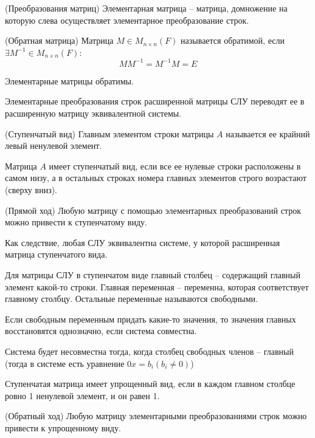 \begin{multicols}{2}
\begin{definition}{(Преобразования матриц)}{}
      Элементарная матрица -- матрица, домножение на которую слева осуществляет элементарное преобразование строк.
\end{definition}
\begin{definition}{(Обратная матрица)}{}
    Матрица $M \in M_{n\times n}(F)$ называется обратимой, если $\exists M^{-1} \in M_{n\times n}(F)$:
    \[
        MM^{-1} = M^{-1}M = E
        \]
\end{definition}
Элементарные матрицы обратимы.
\vspace*{0.3cm}
\begin{note}{}{}
    Элементарные преобразования строк расширенной матрицы СЛУ переводят ее в расширенную матрицу эквивалентной системы.
\end{note} 
\begin{definition}{(Ступенчатый вид)}{}
    Главным элементом строки матрицы $A$ называется ее крайний левый ненулевой элемент. \par
    Матрица $A$ имеет ступенчатый вид, если все ее нулевые строки расположены в самом низу, а в остальных строках номера главных элементов строго возрастают (сверху вниз).
\end{definition}
\begin{theorema}{(Прямой ход)}{}
    Любую матрицу с помощью элементарных преобразований строк можно привести к ступенчатому виду.
\end{theorema}
Как следствие, любая СЛУ эквивалентна системе, у которой расширенная матрица ступенчатого вида.
\begin{definition}{}{}
    Для матрицы СЛУ в ступенчатом виде главный столбец -- содержащий главный элемент какой-то строки. Главная переменная -- переменна, которая соответствует главному столбцу. Остальные переменные называются свободными.
\end{definition}
\begin{note}{}{}
    Если свободным переменным придать какие-то значения, то значения главных восстановятся однозначно, если система совместна.
\end{note}
Система будет несовместна тогда, когда столбец свободных членов -- главный (тогда в системе есть уравнение $0x=b_i (b_i\neq 0)$)
\begin{definition}{}{}
    Ступенчатая матрица имеет упрощенный вид, если в каждом главном столбце ровно 1 ненулевой элемент, и он равен 1.
\end{definition}
\begin{theorema}{(Обратный ход)}{}
    Любую матрицу элементарными преобразованиями строк можно привести к упрощенному виду.

\end{theorema}
\end{multicols}
